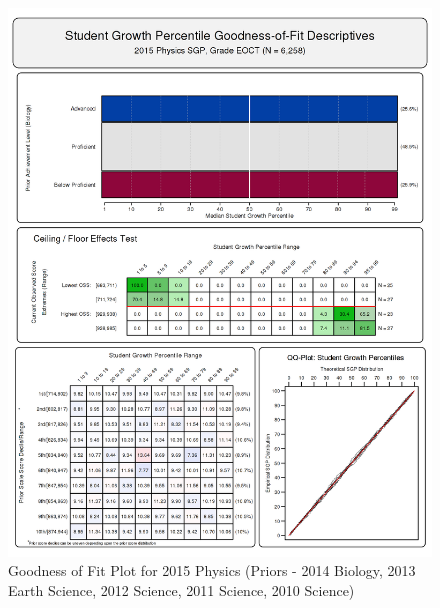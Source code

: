 \documentclass[12pt]{article}
\begin{document}
\begin{figure}[htbp]
\centering
\includegraphics{../img/Goodness_of_Fit/PHYSICS.2015/2015_PHYSICS_EOCT;2014_BIOLOGY_EOCT;2013_EARTH_SCIENCE_EOCT;2012_SCIENCE_EOCT;2011_SCIENCE_EOCT;2010_SCIENCE_EOCT.png}
\caption{Goodness of Fit Plot for 2015 Physics (Priors - 2014 Biology,
2013 Earth Science, 2012 Science, 2011 Science, 2010 Science)}
\end{figure}
\end{document}
